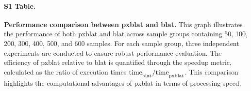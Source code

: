 \documentclass[10pt,letterpaper]{article}
\begin{document}
{%
%
%
%
%

\paragraph*{S1 Table.}
\label{S1_Table}
{\bf Performance comparison between \gls{pxblat} and \gls{blat}.}
This graph illustrates the performance of both \gls{pxblat} and \gls{blat} across sample groups containing 50, 100, 200, 300, 400, 500, and 600 samples.
For each sample group, three independent experiments are conducted to ensure robust performance evaluation.
The efficiency of \gls{pxblat} relative to \gls{blat} is quantified through the speedup metric, calculated as the ratio of execution times \(\mathrm{time}_\textsubscript{blat} / \mathrm{time}_\textsubscript{pxblat} \).
This comparison highlights the computational advantages of \gls{pxblat} in terms of processing speed.

}
\end{document}
